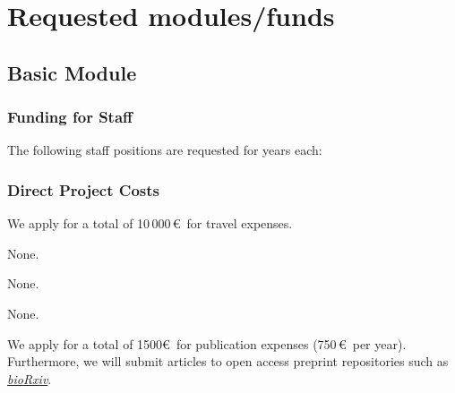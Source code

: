 \documentclass{scrartcl}
\begin{document}
\section{Requested modules/funds}

\subsection{Basic Module}

\subsubsection{Funding for Staff}
\begin{funds}
The following staff positions are requested for  years each:


\end{funds}


\subsubsection{Direct Project Costs}
\begin{funds}



We apply for a total of 10\,000\,\euro\ for travel expenses.

None.

None.

None.

We apply for a total of 1500\euro\ for publication expenses (750\,\euro\ per
year). Furthermore, we will submit articles to open access preprint repositories
such as \href{https://www.biorxiv.org/}{\textit{bioRxiv}}.

\end{funds}
\end{document}
